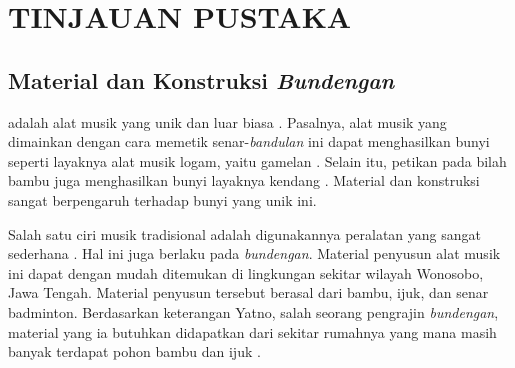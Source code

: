 \chapter{TINJAUAN PUSTAKA}\label{tinjauan pustaka}


\section{Material dan Konstruksi \textit{Bundengan}}\label{subBab:konstruksiBundengan}
\Bundengan adalah alat musik yang unik dan luar biasa \cite{kunst}. Pasalnya, alat musik yang dimainkan dengan cara memetik senar-\textit{bandulan} ini dapat menghasilkan bunyi seperti layaknya alat musik logam, yaitu gamelan \cite{illusiveSound}. Selain itu, petikan pada bilah bambu juga menghasilkan bunyi layaknya kendang \cite{skripsiSaid}. Material dan konstruksi \bundengan sangat berpengaruh terhadap bunyi \bundengan yang unik ini.  \par 
Salah satu ciri musik tradisional adalah digunakannya peralatan yang sangat sederhana \cite{bukuMusik}. Hal ini juga berlaku pada \textit{bundengan}. Material penyusun alat musik ini dapat dengan mudah ditemukan di lingkungan sekitar wilayah Wonosobo, Jawa Tengah. Material penyusun tersebut berasal dari bambu, ijuk, dan senar badminton. Berdasarkan keterangan Yatno, salah seorang pengrajin \textit{bundengan}, material yang ia butuhkan didapatkan dari sekitar rumahnya yang mana masih banyak terdapat pohon bambu dan ijuk \cite{videoBundenganTNTF}.  \par 
